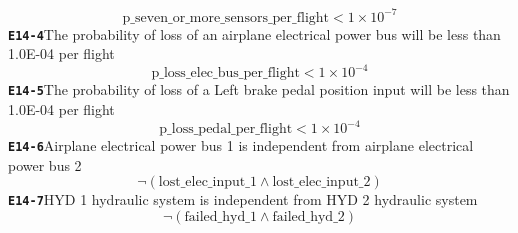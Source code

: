 \documentclass[11pt,a4paper]{article}
\begin{document}
\begin{dmath*}
\text{p\_seven\_or\_more\_sensors\_per\_flight} < 1 \times 10^{-7}
\end{dmath*}
\noindent\textbf{\texttt{E14-4}}\quad The probability of loss of an airplane electrical power bus will be less than 1.0E-04 per flight
\begin{dmath*}
\text{p\_loss\_elec\_bus\_per\_flight} < 1 \times 10^{-4}
\end{dmath*}
\noindent\textbf{\texttt{E14-5}}\quad The probability of loss of a Left brake pedal position input will be less than 1.0E-04 per flight
\begin{dmath*}
\text{p\_loss\_pedal\_per\_flight} < 1 \times 10^{-4}
\end{dmath*}
\noindent\textbf{\texttt{E14-6}}\quad Airplane electrical power bus 1 is independent from airplane electrical power bus 2
\begin{dmath*}
\neg (\text{lost\_elec\_input\_1} \wedge \text{lost\_elec\_input\_2})
\end{dmath*}
\noindent\textbf{\texttt{E14-7}}\quad HYD 1 hydraulic system is independent from HYD 2 hydraulic system
\begin{dmath*}
\neg (\text{failed\_hyd\_1} \wedge \text{failed\_hyd\_2})
\end{dmath*}
\end{document}
